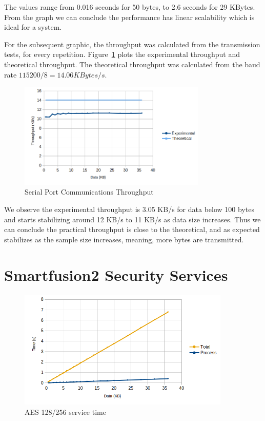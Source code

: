 The values range from 0.016 seconds for 50 bytes, to 2.6 seconds for 29 KBytes.
From the graph we can conclude the performance has linear scalability which is ideal for a system.

For the subsequent graphic, the throughput was calculated from the transmission tests, for every repetition.
Figure~\ref{fig:comms:tput} plots the experimental throughput and theoretical throughput. The theoretical throughput was calculated from the baud rate \(115200/8 = 14.06 KBytes/s\).
\begin{figure}[h!]
	\centering
	\includegraphics[width=0.8\textwidth]{./Images/comms-tput.png}
	\caption{Serial Port Communications Throughput}
	\label{fig:comms:tput}
\end{figure}

We observe the experimental throughput is 3.05 KB/s for data below 100 bytes and starts stabilizing around 12 KB/s to 11 KB/s as data size increases.
Thus we can conclude the practical throughput is close to the theoretical, and as expected stabilizes as the sample size increases, meaning, more bytes are transmitted.

\section{Smartfusion2 Security Services}\label{chap:evaluation:board}

\begin{figure}[h!]
	\centering
	\includegraphics[width=0.9\textwidth]{./Images/aes-time.png}
	\caption{AES 128/256 service time}
	\label{fig:performance:aes:time}
\end{figure}

